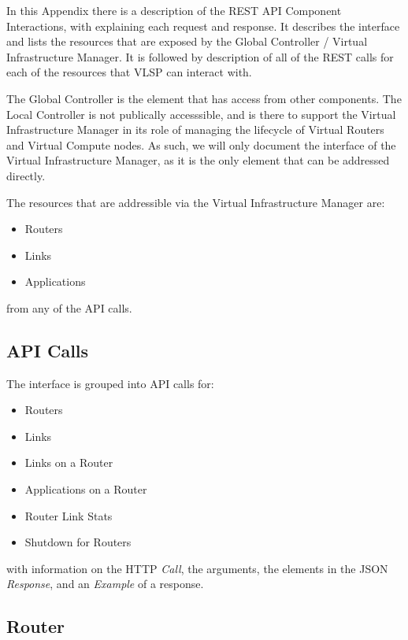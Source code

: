 In this Appendix there is a description of the REST API Component
Interactions, with explaining each request and response.  It
describes the interface and lists the resources that are exposed by
the Global Controller / Virtual Infrastructure Manager. It
is followed by description of all of the REST calls for each of the
resources that VLSP can interact with.

The Global Controller is the element that has access from
other components. The Local Controller is
not publically accesssible, and is there to support the Virtual
Infrastructure Manager in its role of managing the lifecycle of
Virtual Routers and Virtual Compute nodes. As such, we will only
document the interface of the Virtual Infrastructure Manager, as it is
the only element that can be addressed directly. 

The resources that are addressible via the Virtual Infrastructure
Manager are:

\begin{itemize}
\item Routers
\item Links
\item Applications
\end{itemize}

\noindent from any of the API calls.

\raggedbottom

\subsection*{API Calls}

The interface is grouped into API calls for:

\begin{itemize}
\item Routers
\item Links
\item Links on a Router
\item Applications on a Router
\item Router Link Stats
\item Shutdown for Routers
\end{itemize}

\noindent with information on the HTTP \emph{Call}, the arguments, the elements in the JSON \emph{Response}, and an \emph{Example} of a response.

\subsection{Router}

